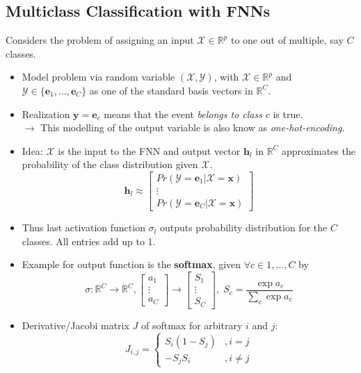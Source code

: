 \documentclass[english]{latex4ei/latex4ei_sheet}
\begin{document}
\begin{sectionbox}
\subsection{Multiclass Classification with FNNs}
Considers the problem of assigning an input $\mathcal{X}\in\mathbb{R}^p$ to one out of multiple, say $C$ classes.
\begin{itemize}
    \item Model problem via random variable $(\mathcal{X,Y})$, with $\mathcal{X}\in\mathbb{R}^p$ and $\mathcal{Y}\in\{\mathbf{e}_1,...,\mathbf{e}_C\}$ as one of the standard basis vectors in $\mathbb{R}^C$.
    \item Realization $\mathbf{y}=\mathbf{e}_c$ means that the event \emph{belongs to class} $c$ is true.\\
    $\rightarrow$ This modelling of the output variable is also know as \emph{one-hot-encoding}.
    \item Idea: $\mathcal{X}$ is the input to the FNN and output vector $\mathbf{h}_l$ in $\mathbb{R}^C$ approximates the probability of the class distribution given $\mathcal{X}$.
    \[
    \mathbf{h}_l\approx
    \begin{bmatrix}
    Pr(\mathcal{Y}=\mathbf{e}_1|\mathcal{X}=\mathbf{x})\\
    \vdots\\
    Pr(\mathcal{Y}=\mathbf{e}_C|\mathcal{X}=\mathbf{x})
    \end{bmatrix}
    \]
    \item Thus last activation function $\sigma_l$ outputs probability distribution for the $C$ classes. All entries add up to 1.
    \item Example for output function is the \textbf{softmax}, given $\forall c\in1,...,C$ by
    \[
    \sigma:\mathbb{R}^C \to \mathbb{R}^C,
    \begin{bmatrix}
    a_1\\ \vdots\\ a_C
    \end{bmatrix}
    \to
    \begin{bmatrix}
    S_1\\ \vdots\\ S_C
    \end{bmatrix},\; S_c=\frac{\exp a_c}{\sum_c\exp a_c}
    \]
    \item Derivative/Jacobi matrix $J$ of softmax for arbitrary $i$ and $j$:
    \[
    J_{i,j} = \begin{cases}
        S_i(1-S_j) & ,i=j\\
        -S_j S_i & ,i\ne j
        \end{cases}
    \]
\end{itemize}
\end{sectionbox}
\end{document}
